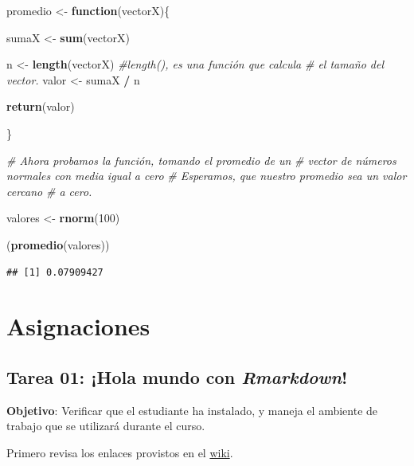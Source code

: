 \documentclass[12pt,letterpaper,]{book}
\newenvironment{Shaded}{\begin{snugshade}}{\end{snugshade}}
\newcommand{\KeywordTok}[1]{\textcolor[rgb]{0.13,0.29,0.53}{\textbf{#1}}}
\newcommand{\DecValTok}[1]{\textcolor[rgb]{0.00,0.00,0.81}{#1}}
\newcommand{\StringTok}[1]{\textcolor[rgb]{0.31,0.60,0.02}{#1}}
\newcommand{\CommentTok}[1]{\textcolor[rgb]{0.56,0.35,0.01}{\textit{#1}}}
\newcommand{\ControlFlowTok}[1]{\textcolor[rgb]{0.13,0.29,0.53}{\textbf{#1}}}
\newcommand{\OperatorTok}[1]{\textcolor[rgb]{0.81,0.36,0.00}{\textbf{#1}}}
\newcommand{\NormalTok}[1]{#1}
\begin{document}
\begin{Shaded}
\begin{Highlighting}[]
\NormalTok{promedio <-}\StringTok{ }\ControlFlowTok{function}\NormalTok{(vectorX)\{}
 
\NormalTok{   sumaX <-}\StringTok{ }\KeywordTok{sum}\NormalTok{(vectorX)}
   
\NormalTok{  n <-}\StringTok{ }\KeywordTok{length}\NormalTok{(vectorX) }\CommentTok{#length(), es una función que calcula }
                       \CommentTok{#   el tamaño del vector.}
\NormalTok{  valor <-}\StringTok{ }\NormalTok{sumaX }\OperatorTok{/}\StringTok{ }\NormalTok{n }
  
  \KeywordTok{return}\NormalTok{(valor)}
  
\NormalTok{\}}

\CommentTok{# Ahora probamos la función, tomando el promedio de un }
\CommentTok{#       vector de números normales con media igual a cero}
\CommentTok{#       Esperamos, que nuestro promedio sea un valor cercano}
\CommentTok{#         a cero.}

\NormalTok{valores <-}\StringTok{ }\KeywordTok{rnorm}\NormalTok{(}\DecValTok{100}\NormalTok{)}

\NormalTok{(}\KeywordTok{promedio}\NormalTok{(valores))}
\end{Highlighting}
\end{Shaded}

\begin{verbatim}
## [1] 0.07909427
\end{verbatim}

\chapter{Asignaciones}\label{asignaciones}

\section{\texorpdfstring{Tarea 01: ¡Hola mundo con
\emph{Rmarkdown}!}{Tarea 01: ¡Hola mundo con Rmarkdown!}}\label{tarea-01-hola-mundo-con-rmarkdown}

\textbf{Objetivo}: Verificar que el estudiante ha instalado, y maneja el
ambiente de trabajo que se utilizará durante el curso.

Primero revisa los enlaces provistos en el
\href{https://github.com/dawidh15/dinPob/wiki/02-Instalaci\%C3\%B3n-del-software-necesario\#prueba-con-rmarkdown}{wiki}.
\end{document}
